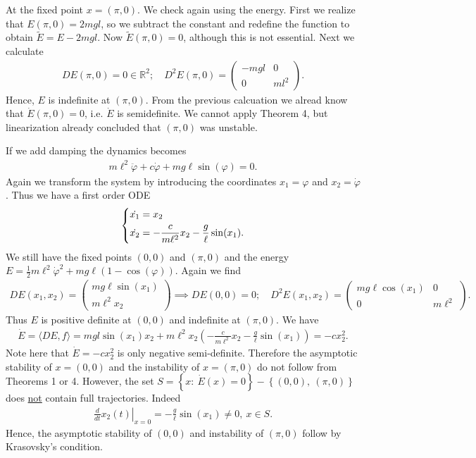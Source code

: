 \begin{ex}
At the fixed point $x = (\pi, 0)$. We check again using the energy. First we realize that $E(\pi, 0)= 2mgl$, so we subtract the constant and redefine the function to obtain $\tilde{E}= E - 2mgl$. Now $\tilde{E}(\pi, 0) = 0$, although this is not essential. Next we calculate
\begin{align}
	DE(\pi, 0) = 0\in \mathbb{R}^{2};\quad D^2E(\pi, 0) = 
	\begin{pmatrix}
		-mgl & 0 \\
		0 & ml^2
	\end{pmatrix}
	.
\end{align}
Hence, $E$ is indefinite at $(\pi, 0)$. From the previous calcuation we alread know that $\dot{E}(\pi, 0) = 0$, i.e. $\dot{E}$ is semidefinite. We cannot apply Theorem 4, but linearization already concluded that $(\pi,0)$ was unstable.

If we add damping the dynamics becomes
\begin{align}
	m\ell^2 \ddot{\varphi} + c \dot{\varphi} + mg\ell \sin(\varphi) =0.
\end{align}
Again we transform the system by introducing the coordinates $x_1 =\varphi$ and $x_2=\dot{\varphi}$. Thus we have a first order ODE
\begin{align}
	\begin{dcases}
		\dot{x_1} = x_2 \\
		\dot{x_2} = - \frac{c}{m\ell^2}x_2 - \frac{g}{\ell}\sin(x_1).
	\end{dcases}
\end{align}
We still have the fixed points $(0,0)$ and $(\pi, 0)$ and the energy $E = \frac{1}{2}m \ell^2 \dot{\varphi}^2 + mg \ell(1 - \cos(\varphi))$. Again we find
\begin{align}
	DE(x_1, x_2) =
	\begin{pmatrix}
		mg\ell \sin(x_1) \\ m \ell^2 x_2
	\end{pmatrix}
	\implies DE(0,0) = 0;\quad
	D^2E(x_1, x_2) =
	\begin{pmatrix}
		mg\ell \cos(x_1) & 0 \\
		0 & m \ell^2
	\end{pmatrix}
	.
\end{align}
Thus $E$ is positive definite at $(0,0)$ and indefinite at $( \pi,0 )$. We have
\begin{align}
	\dot{E} = \langle DE, f\rangle  = mgl \sin(x_1)x_2 + m\ell^2 x_2 \left(-\frac{c}{m\ell^2}x_2 - \frac{g}{\ell}\sin(x_1)\right) = - cx_2^2.
\end{align}
Note here that $\dot{E}= -cx_2^2$ is only negative semi-definite. Therefore the asymptotic stability of $x=(0,0)$ and the instability of $x=(\pi,0 )$ do not follow from Theorems 1 or 4. However, the set $S=\left\{x:\ \dot{E}(x)=0\right\} - \left\{(0,0),\ (\pi,0 )\right\}$ does \underline{not} contain full trajectories. Indeed
\begin{align}
	\left.\frac{d}{dt}x_2(t)\right|_{x=0} = -\frac{g}{\ell}\sin(x_1) \neq 0,\ x\in S.
\end{align}
Hence, the asymptotic stability of $(0,0)$ and instability of $(\pi, 0)$ follow by Krasovsky's condition.
\end{ex}
